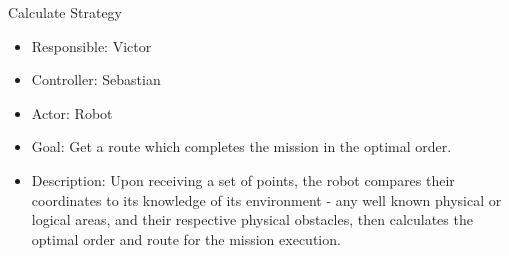 Calculate Strategy
\begin{itemize}
    \item Responsible: Victor
    \item Controller: Sebastian
    \item Actor: Robot
    \item Goal: Get a route which completes the mission in the optimal order.
    \item Description: Upon receiving a set of points, the robot compares their coordinates to its knowledge of its environment - any well known physical or logical areas, and their respective physical obstacles, then calculates the optimal order and route for the mission execution.
\end{itemize}